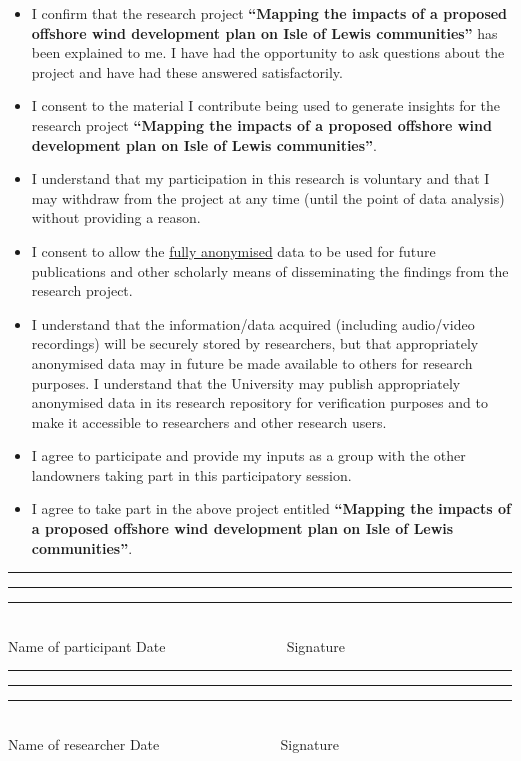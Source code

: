 {\begin{itemize}[label=]
  \item I confirm that the research project \textbf{``Mapping the impacts of a
  proposed offshore wind development plan on Isle of Lewis communities''} has
  been explained to me. I have had the opportunity to ask questions about the
  project and have had these answered satisfactorily.
  \item I consent to the material I contribute being used to generate insights
  for the research project \textbf{``Mapping the impacts of a proposed offshore
  wind development plan on Isle of Lewis communities''}.
  \item I understand that my participation in this research is voluntary and
  that I may withdraw from the project at any time (until the point of data
  analysis) without providing a reason.
  \item I consent to allow the \underline{fully anonymised} data to be used for
  future publications and other scholarly means of disseminating the findings
  from the research project.
  \item I understand that the information/data acquired (including audio/video
  recordings) will be securely stored by researchers, but that appropriately
  anonymised data may in future be made available to others for research
  purposes. I understand that the University may publish appropriately
  anonymised data in its research repository for verification purposes and to
  make it accessible to researchers and other research users.
  \item I agree to participate and provide my inputs as a group with the other
  landowners taking part in this participatory session.
  \item I agree to take part in the above project entitled \textbf{``Mapping
  the impacts of a proposed offshore wind development plan on Isle of Lewis
  communities''}.
\end{itemize}

\vspace{50pt}
\begin{center}
  \footnotesize
  \rule{100pt}{.5pt} \hfill \rule{100pt}{.5pt} \hfill \rule{100pt}{.5pt}\\
  Name of participant \hfill Date \hfill ~~~~~~~~~~~~~~~~ Signature \\[35pt]
  \rule{100pt}{.5pt} \hfill \rule{100pt}{.5pt} \hfill \rule{100pt}{.5pt}\\
  Name of researcher \hfill Date \hfill ~~~~~~~~~~~~~~~~ Signature
\end{center}
}
